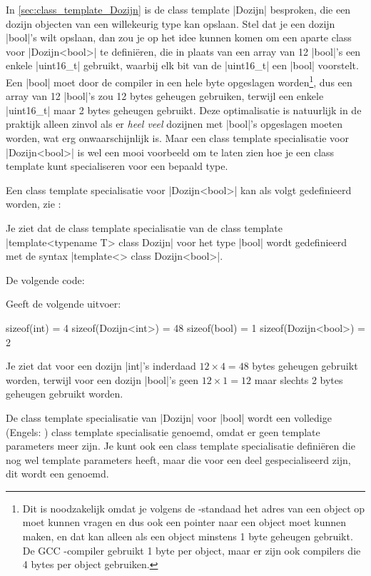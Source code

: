 \begin{cpplstShortInline}
In \cref{sec:class_template_Dozijn} is de class template |Dozijn| besproken, die een dozijn objecten van een willekeurig type kan opslaan.
Stel dat je een dozijn |bool|'s wilt opslaan, dan zou je op het idee kunnen komen om een aparte  class voor |Dozijn<bool>| te definiëren, die in plaats van een array van 12 |bool|'s een enkele |uint16_t| gebruikt, waarbij elk bit van de |uint16_t| een |bool| voorstelt.
Een |bool| moet door de compiler in een hele byte opgeslagen worden\footnote{%
	Dit is noodzakelijk omdat je volgens de \Cpp{}-standaad het adres van een  object op moet kunnen vragen en dus ook een pointer naar een  object moet kunnen maken, en dat kan alleen als een  object minstens 1 byte geheugen gebruikt.
	De GCC \Cpp{}\hyp{}compiler gebruikt 1 byte per  object, maar er zijn ook compilers die 4 bytes per  object gebruiken.
}, dus een array van 12 |bool|'s zou 12 bytes geheugen gebruiken, terwijl een enkele |uint16_t| maar 2 bytes geheugen gebruikt.
Deze optimalisatie is natuurlijk in de praktijk alleen zinvol als er \emph{heel veel} dozijnen met |bool|'s opgeslagen moeten worden, wat erg onwaarschijnlijk is.
Maar een class template specialisatie voor |Dozijn<bool>| is wel een mooi voorbeeld om te laten zien hoe je een class template kunt specialiseren voor een bepaald type.

Een class template specialisatie voor |Dozijn<bool>| kan als volgt gedefinieerd worden, zie :

Je ziet dat de class template specialisatie van de class template |template<typename T> class Dozijn| voor het type |bool| wordt gedefinieerd met de syntax |template<> class Dozijn<bool>|.

De volgende code:

Geeft de volgende uitvoer:
\begin{coutput}
sizeof(int) = 4
sizeof(Dozijn<int>) = 48
sizeof(bool) = 1
sizeof(Dozijn<bool>) = 2
\end{coutput}

Je ziet dat voor een dozijn |int|'s inderdaad $12 \times 4{} = 48$ bytes geheugen gebruikt worden, terwijl voor een dozijn |bool|'s geen $12 \times{} 1 = 12$ maar slechts 2 bytes geheugen gebruikt worden.

De class template specialisatie van |Dozijn| voor |bool| wordt een volledige (Engels: ) class template specialisatie genoemd, omdat er geen template parameters meer zijn.
Je kunt ook een class template specialisatie definiëren die nog wel template parameters heeft, maar die voor een deel gespecialiseerd zijn, dit wordt een  genoemd.


\end{cpplstShortInline}
